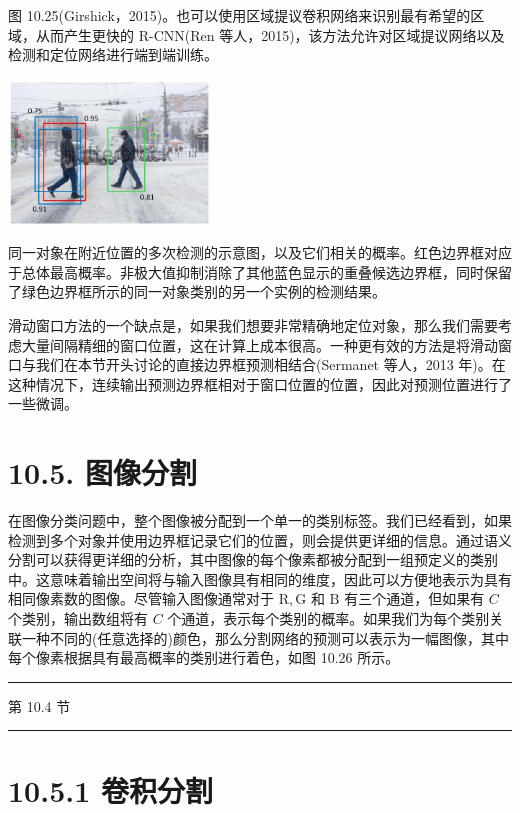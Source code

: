 \documentclass[10pt]{report}
\newcommand{\HRule}{\begin{center}\rule{0.9\linewidth}{0.2mm}\end{center}}
\begin{document}
图 10.25(Girshick，2015)。也可以使用区域提议卷积网络来识别最有希望的区域，从而产生更快的 R-CNN(Ren 等人，2015)，该方法允许对区域提议网络以及检测和定位网络进行端到端训练。

\begin{center}
\includegraphics[max width=0.4\textwidth]{images/0194e279-9b28-703a-88f4-c3ac21e2010d_334_931_347_614_444_0.jpg}
\end{center}
\hspace*{3em} 

同一对象在附近位置的多次检测的示意图，以及它们相关的概率。红色边界框对应于总体最高概率。非极大值抑制消除了其他蓝色显示的重叠候选边界框，同时保留了绿色边界框所示的同一对象类别的另一个实例的检测结果。

滑动窗口方法的一个缺点是，如果我们想要非常精确地定位对象，那么我们需要考虑大量间隔精细的窗口位置，这在计算上成本很高。一种更有效的方法是将滑动窗口与我们在本节开头讨论的直接边界框预测相结合(Sermanet 等人，2013 年)。在这种情况下，连续输出预测边界框相对于窗口位置的位置，因此对预测位置进行了一些微调。

\section*{10.5. 图像分割}

在图像分类问题中，整个图像被分配到一个单一的类别标签。我们已经看到，如果检测到多个对象并使用边界框记录它们的位置，则会提供更详细的信息。通过语义分割可以获得更详细的分析，其中图像的每个像素都被分配到一组预定义的类别中。这意味着输出空间将与输入图像具有相同的维度，因此可以方便地表示为具有相同像素数的图像。尽管输入图像通常对于 \(\mathrm{R},\mathrm{G}\) 和 \(\mathrm{B}\) 有三个通道，但如果有 \(C\) 个类别，输出数组将有 \(C\) 个通道，表示每个类别的概率。如果我们为每个类别关联一种不同的(任意选择的)颜色，那么分割网络的预测可以表示为一幅图像，其中每个像素根据具有最高概率的类别进行着色，如图 10.26 所示。

\HRule

第 10.4 节

\HRule

\section*{10.5.1 卷积分割}
\end{document}
